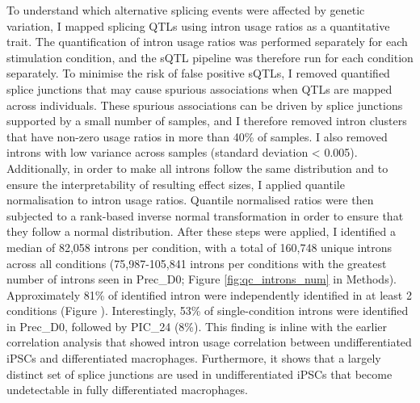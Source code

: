 To understand which alternative splicing events were affected by genetic variation, I mapped splicing QTLs using intron usage ratios as a quantitative trait. The quantification of intron usage ratios was performed separately for each stimulation condition, and the sQTL pipeline was therefore run for each condition separately. To minimise the risk of false positive sQTLs, I removed quantified splice junctions that may cause spurious associations when QTLs are mapped across individuals. These spurious associations can be driven by splice junctions supported by a small number of samples, and I therefore removed intron clusters that have non-zero usage ratios in more than 40\% of samples. I also removed introns with low variance across samples (standard deviation < 0.005). Additionally, in order to make all introns follow the same distribution and to ensure the interpretability of resulting effect sizes, I applied quantile normalisation to intron usage ratios. Quantile normalised ratios were then subjected to a rank-based inverse normal transformation in order to ensure that they follow a normal distribution. After these steps were applied, I identified a median of 82,058 introns per condition, with a total of 160,748 unique introns across all conditions (75,987-105,841 introns per conditions with the greatest  number of introns seen in Prec\_D0; Figure \ref{fig:qc_introns_num} in Methods). Approximately 81\% of identified intron were independently identified in at least 2 conditions (Figure ). Interestingly, 53\% of single-condition introns were identified in Prec\_D0, followed by PIC\_24 (8\%). This finding is inline with the earlier correlation analysis that showed intron usage correlation between undifferentiated iPSCs and differentiated macrophages. Furthermore, it shows that a largely distinct set of splice junctions are used in undifferentiated iPSCs that become undetectable in fully differentiated macrophages. \\

